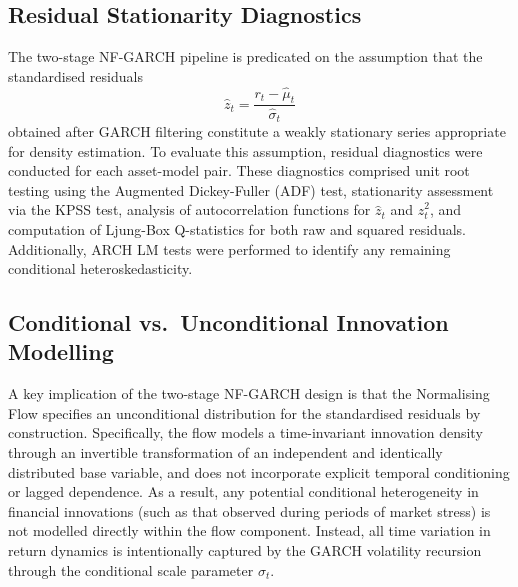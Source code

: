 \documentclass[oneside,12pt]{CUEDthesisPSnPDF}
\begin{document}

\subsection{Residual Stationarity Diagnostics}
\label{subsec:resid_stationarity}
\noindent
The two-stage NF-GARCH pipeline is predicated on the assumption that the standardised residuals
\[
\hat{z}_t = \frac{r_t - \hat{\mu}_t}{\hat{\sigma}_t}
\]
obtained after GARCH filtering constitute a weakly stationary series appropriate for density estimation. To evaluate this assumption, residual diagnostics were conducted for each asset-model pair. These diagnostics comprised unit root testing using the Augmented Dickey-Fuller (ADF) test, stationarity assessment via the KPSS test, analysis of autocorrelation functions for $\hat{z}_t$ and $\hat{z}_t^2$, and computation of Ljung-Box Q-statistics for both raw and squared residuals. Additionally, ARCH LM tests were performed to identify any remaining conditional heteroskedasticity.\\



\subsection{Conditional vs.\ Unconditional Innovation Modelling}
\label{subsec:conditional_vs_unconditional}
\noindent

A key implication of the two-stage NF-GARCH design is that the Normalising Flow specifies an unconditional distribution for the standardised residuals by construction. Specifically, the flow models a time-invariant innovation density through an invertible transformation of an independent and identically distributed base variable, and does not incorporate explicit temporal conditioning or lagged dependence. As a result, any potential conditional heterogeneity in financial innovations (such as that observed during periods of market stress) is not modelled directly within the flow component. Instead, all time variation in return dynamics is intentionally captured by the GARCH volatility recursion through the conditional scale parameter $\sigma_t$.\\ 
\end{document}
